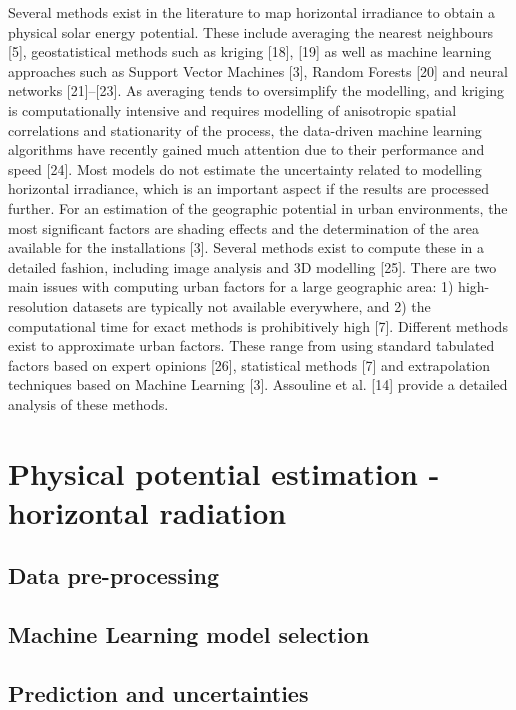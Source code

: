 Several methods exist in the literature to map horizontal irradiance to obtain a physical solar energy potential. These include averaging the nearest neighbours [5], geostatistical methods such as kriging [18], [19] as well as machine learning approaches such as Support Vector Machines [3], Random Forests [20] and neural networks [21]–[23]. As averaging tends to oversimplify the modelling, and kriging is computationally intensive and requires modelling of anisotropic spatial correlations and stationarity of the process, the data-driven machine learning algorithms have recently gained much attention due to their performance and speed [24]. Most models do not estimate the uncertainty related to modelling horizontal irradiance, which is an important aspect if the results are processed further.
For an estimation of the geographic potential in urban environments, the most significant factors are shading effects and the determination of the area available for the installations [3]. Several methods exist to compute these in a detailed fashion, including image analysis and 3D modelling [25]. There are two main issues with computing urban factors for a large geographic area: 1) high-resolution datasets are typically not available everywhere, and 2) the computational time for exact methods is prohibitively high [7]. Different methods exist to approximate urban factors. These range from using standard tabulated factors based on expert opinions [26], statistical methods [7] and extrapolation techniques based on Machine Learning [3]. Assouline et al. [14] provide a detailed analysis of these methods. 

\section{Physical potential estimation - horizontal radiation}
\label{solar_phys}

\subsection{Data pre-processing}

\subsection{Machine Learning model selection}

\subsection{Prediction and uncertainties}

